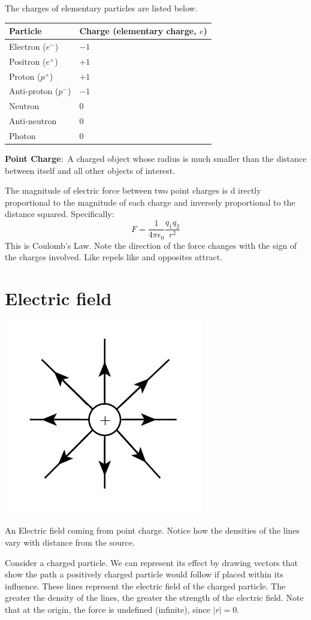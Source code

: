 \documentclass[nobib]{tufte-handout}
\newcommand{\defn}[2]{\noindent\textbf{#1}:\ #2}
\begin{document}
The charges of elementary particles are listed below.
\begin{table}[ht]
    \centering
    \begin{tabular}{@{}ll@{}}
    \toprule
    Particle & Charge (elementary charge, $e$) \\
    \midrule
    Electron ($e^-$) & $-1$ \\
    Positron ($e^+$) & $+1$ \\
    Proton ($p^+$) & $+1$ \\
    Anti-proton ($p^-$) & $-1$ \\
    Neutron& $0$ \\
    Anti-neutron & $0$ \\
    Photon& $0$ \\
    \bottomrule
    \end{tabular}
    \end{table}

\defn{Point Charge}{A charged object whose
radius is much smaller than the distance
between itself and all other objects of
interest.}

The magnitude of electric force between two point charges is d
irectly proportional to the magnitude of each charge and 
inversely proportional to the distance squared. Specifically:
\[F = \frac{1}{4\pi \epsilon_0}\frac{q_1 q_2}{r^2}\]
This is Coulomb's Law. Note the direction of the force changes
with the sign of the charges involved. Like repels like and opposites
attract. 

\section{Electric field}

\begin{marginfigure}
    \includegraphics{images/electricfieldlines.jpg}
    \caption{An Electric field coming from point charge. 
    Notice how the densities of the lines vary with distance from the source.}
    \label{fig:electric-field-lines-point-charge}
\end{marginfigure}
Consider a charged particle. We can represent its effect
by drawing vectors that show the path a positively charged 
particle would follow if placed within its influence. These lines represent the 
electric field of the charged particle. The greater the density of the lines, the greater 
the strength of the electric field. Note that at the origin, the force is
undefined (infinite), since $|r| = 0$. 
\end{document}
